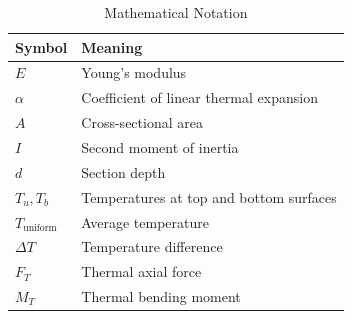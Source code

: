 \documentclass[12pt,a4paper]{article}
\begin{document}
\begin{table}[H]
    \centering
    \caption{Mathematical Notation}
    \label{tab:notation}
    \begin{tabular}{ll}
        \toprule
        \textbf{Symbol} & \textbf{Meaning} \\
        \midrule
        $E$ & Young's modulus \\
        $\alpha$ & Coefficient of linear thermal expansion \\
        $A$ & Cross-sectional area \\
        $I$ & Second moment of inertia \\
        $d$ & Section depth \\
        $T_u, T_b$ & Temperatures at top and bottom surfaces \\
        $T_{\text{uniform}}$ & Average temperature \\
        $\Delta T$ & Temperature difference \\
        $F_T$ & Thermal axial force \\
        $M_T$ & Thermal bending moment \\
        \bottomrule
    \end{tabular}
\end{table}
\end{document}
